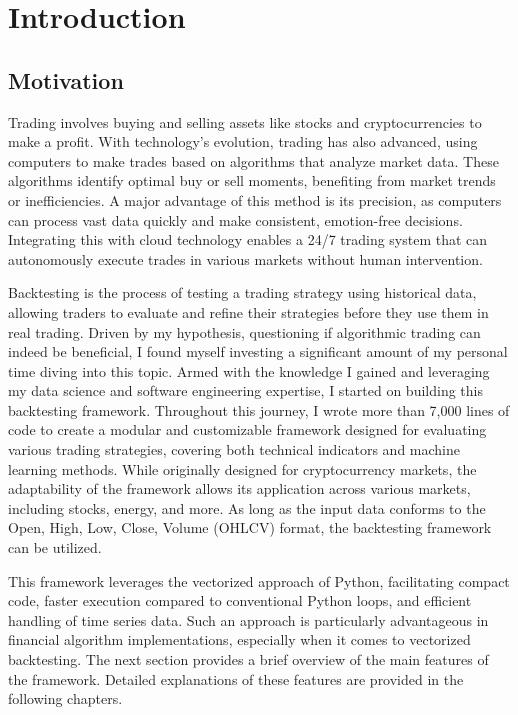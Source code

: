 \chapter{Introduction}

\section{Motivation}
Trading involves buying and selling assets like stocks and cryptocurrencies to make a profit.
With technology's evolution, trading has also advanced, using computers to make trades based on algorithms that analyze market data.
These algorithms identify optimal buy or sell moments, benefiting from market trends or inefficiencies.
A major advantage of this method is its precision, as computers can process vast data quickly and make consistent, emotion-free decisions.
Integrating this with cloud technology enables a 24/7 trading system that can autonomously execute trades in various markets without human intervention.

Backtesting is the process of testing a trading strategy using historical data, allowing traders to evaluate and refine their strategies before they use them in real trading.
Driven by my hypothesis, questioning if algorithmic trading can indeed be beneficial, I found myself investing a significant amount of my personal time diving into this topic.
Armed with the knowledge I gained and leveraging my data science and software engineering expertise, I started on building this backtesting framework.
Throughout this journey, I wrote more than 7,000 lines of code to create a modular and customizable framework designed for evaluating various trading strategies, covering both technical indicators and machine learning methods.
While originally designed for cryptocurrency markets, the adaptability of the framework allows its application across various markets, including stocks, energy, and more.
As long as the input data conforms to the Open, High, Low, Close, Volume (OHLCV) format, the backtesting framework can be utilized.

This framework leverages the vectorized approach of Python, facilitating compact code, faster execution compared to conventional Python loops, and efficient handling of time series data.
Such an approach is particularly advantageous in financial algorithm implementations, especially when it comes to vectorized backtesting.
The next section provides a brief overview of the main features of the framework.
Detailed explanations of these features are provided in the following chapters.


